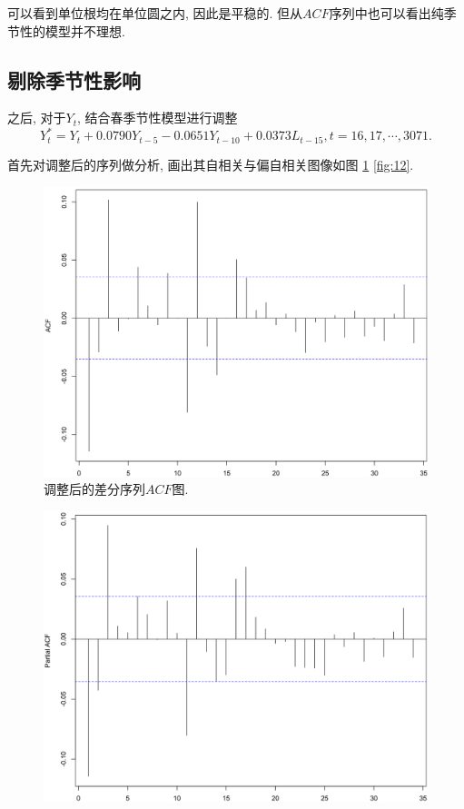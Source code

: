 \documentclass[11pt]{article}
\begin{document}
\qquad 可以看到单位根均在单位圆之内, 因此是平稳的. 但从$ACF$序列中也可以看出纯季节性的模型并不理想. 
\subsection{剔除季节性影响}








\qquad 之后, 对于$Y_t$, 结合春季节性模型进行调整
\[
    Y_t^*=Y_t+0.0790Y_{t-5}-0.0651Y_{t-10}+0.0373L_{t-15}, t=16,17,\cdots,3071.
\]

首先对调整后的序列做分析, 画出其自相关与偏自相关图像如图 \ref{fig:11} \ref{fig:12}. 

\begin{center}
    \hspace{30pt}\begin{minipage}{0.45\textwidth}
        \begin{figure}
            \centering
            \hspace{-25pt}\includegraphics[width=.9\textwidth]{acf2}
            \caption{调整后的差分序列$ACF$图.\label{fig:11}}
        \end{figure}
    \end{minipage}
    \begin{minipage}{0.45\textwidth}
        \begin{figure}
            \centering
            \hspace{-25pt}\includegraphics[width=.9\textwidth]{pacf2}

\end{figure}
\end{minipage}
\end{center}
\end{document}
